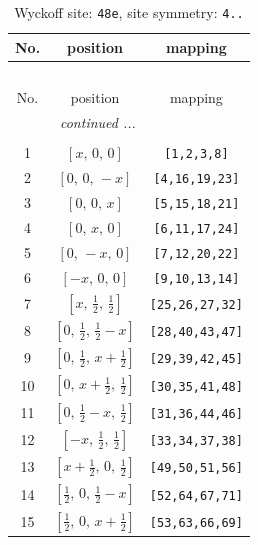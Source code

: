 \documentclass[fleqn,8pt]{jsarticle}
\begin{document}
\begin{longtable}{ccc}
\caption{Wyckoff site: {\tt 48e}, site symmetry: {\tt 4..}}
 \\
 \hline \hline
No. & position & mapping \\ \hline \endfirsthead

\multicolumn{2}{l}{\tablename\ \thetable{}} \\
 \hline \hline
No. & position & mapping \\ \hline \endhead

 \hline \hline
\multicolumn{2}{r}{\footnotesize\it continued ...} \\ \endfoot

 \hline \hline
\multicolumn{2}{r}{} \\ \endlastfoot

1 & $\left[ x,\, 0,\, 0 \right]$ & {\tt [1,2,3,8]} \\ \hline
2 & $\left[ 0,\, 0,\, - x \right]$ & {\tt [4,16,19,23]} \\ \hline
3 & $\left[ 0,\, 0,\, x \right]$ & {\tt [5,15,18,21]} \\ \hline
4 & $\left[ 0,\, x,\, 0 \right]$ & {\tt [6,11,17,24]} \\ \hline
5 & $\left[ 0,\, - x,\, 0 \right]$ & {\tt [7,12,20,22]} \\ \hline
6 & $\left[ - x,\, 0,\, 0 \right]$ & {\tt [9,10,13,14]} \\ \hline
7 & $\left[ x,\, \frac{1}{2},\, \frac{1}{2} \right]$ & {\tt [25,26,27,32]} \\ \hline
8 & $\left[ 0,\, \frac{1}{2},\, \frac{1}{2} - x \right]$ & {\tt [28,40,43,47]} \\ \hline
9 & $\left[ 0,\, \frac{1}{2},\, x + \frac{1}{2} \right]$ & {\tt [29,39,42,45]} \\ \hline
10 & $\left[ 0,\, x + \frac{1}{2},\, \frac{1}{2} \right]$ & {\tt [30,35,41,48]} \\ \hline
11 & $\left[ 0,\, \frac{1}{2} - x,\, \frac{1}{2} \right]$ & {\tt [31,36,44,46]} \\ \hline
12 & $\left[ - x,\, \frac{1}{2},\, \frac{1}{2} \right]$ & {\tt [33,34,37,38]} \\ \hline
13 & $\left[ x + \frac{1}{2},\, 0,\, \frac{1}{2} \right]$ & {\tt [49,50,51,56]} \\ \hline
14 & $\left[ \frac{1}{2},\, 0,\, \frac{1}{2} - x \right]$ & {\tt [52,64,67,71]} \\ \hline
15 & $\left[ \frac{1}{2},\, 0,\, x + \frac{1}{2} \right]$ & {\tt [53,63,66,69]} \\ \hline

\end{longtable}
\end{document}
